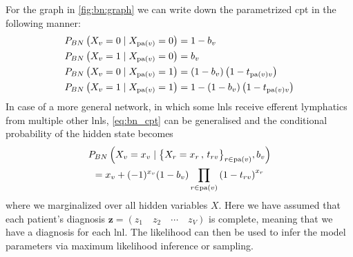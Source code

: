 \documentclass[\relativeRoot/main.tex]{subfiles}
\begin{document}
For the graph in \cref{fig:bn:graph} we can write down the parametrized \gls{cpt} in the following manner:
%
\begin{equation} \label{eq:bn_cpt}
    \begin{aligned}
        P_{BN} \left( X_v = 0 \mid X_{\operatorname{pa}(v)} = 0 \right) &= 1 - b_v \\
        P_{BN} \left( X_v = 1 \mid X_{\operatorname{pa}(v)} = 0 \right) &= b_v \\
        P_{BN} \left( X_v = 0 \mid X_{\operatorname{pa}(v)} = 1 \right) &= (1 - b_v) \left(1 - t_{\operatorname{pa}(v)v}\right) \\
        P_{BN} \left( X_v = 1 \mid X_{\operatorname{pa}(v)} = 1 \right) &= 1 - (1 - b_v) \left(1 - t_{\operatorname{pa}(v)v}\right) 
    \end{aligned}
\end{equation}
%
In case of a more general network, in which some \glspl{lnl} receive efferent lymphatics from multiple other \glspl{lnl}, \cref{eq:bn_cpt} can be generalised and the conditional probability of the hidden state becomes
%
\begin{multline}
    P_{BN} \left( X_v = x_v \mid \big\{ X_r = x_r \,,\, t_{rv} \big\}_{r \in \operatorname{pa}(v)} , b_v \right) \\
    = x_v + (-1)^{x_v} (1 - b_v) \prod_{r \in \operatorname{pa}(v)}{\left( 1 - t_{rv} \right)}^{x_r}
\end{multline}
%
where we marginalized over all hidden variables $X$. Here we have assumed that each patient's diagnosis $\mathbf{z} = \left( z_1 \quad z_2 \quad \cdots \quad z_V \right)$ is complete, meaning that we have a diagnosis for each \gls{lnl}. The likelihood can then be used to infer the model parameters via maximum likelihood inference or sampling.
\end{document}
